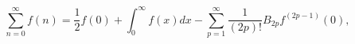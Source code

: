 \begin{equation}
\sum_{n=0}^\infty f(n)=\frac{1}{2}f(0)+\int_0^\infty
f(x)dx-\sum_{p=1}^\infty\frac{1}{(2p)!}B_{2p}f^{(2p-1)}(0),
\label{em}
\end{equation}

